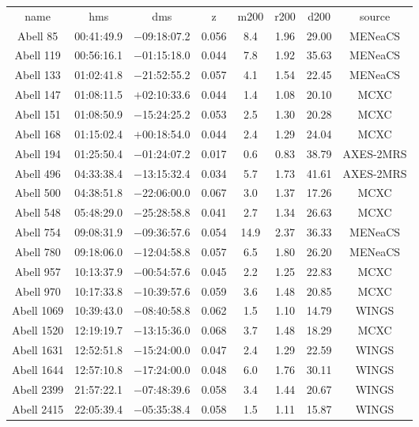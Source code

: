 \begin{table}
\begin{tabular}{cccccccc}
name & hms & dms & z & m200 & r200 & d200 & source \\
Abell 85 & 00:41:49.9 & $-$09:18:07.2 & 0.056 & 8.4 & 1.96 & 29.00 & MENeaCS \\
Abell 119 & 00:56:16.1 & $-$01:15:18.0 & 0.044 & 7.8 & 1.92 & 35.63 & MENeaCS \\
Abell 133 & 01:02:41.8 & $-$21:52:55.2 & 0.057 & 4.1 & 1.54 & 22.45 & MENeaCS \\
Abell 147 & 01:08:11.5 & $+$02:10:33.6 & 0.044 & 1.4 & 1.08 & 20.10 & MCXC \\
Abell 151 & 01:08:50.9 & $-$15:24:25.2 & 0.053 & 2.5 & 1.30 & 20.28 & MCXC \\
Abell 168 & 01:15:02.4 & $+$00:18:54.0 & 0.044 & 2.4 & 1.29 & 24.04 & MCXC \\
Abell 194 & 01:25:50.4 & $-$01:24:07.2 & 0.017 & 0.6 & 0.83 & 38.79 & AXES-2MRS \\
Abell 496 & 04:33:38.4 & $-$13:15:32.4 & 0.034 & 5.7 & 1.73 & 41.61 & AXES-2MRS \\
Abell 500 & 04:38:51.8 & $-$22:06:00.0 & 0.067 & 3.0 & 1.37 & 17.26 & MCXC \\
Abell 548 & 05:48:29.0 & $-$25:28:58.8 & 0.041 & 2.7 & 1.34 & 26.63 & MCXC \\
Abell 754 & 09:08:31.9 & $-$09:36:57.6 & 0.054 & 14.9 & 2.37 & 36.33 & MENeaCS \\
Abell 780 & 09:18:06.0 & $-$12:04:58.8 & 0.057 & 6.5 & 1.80 & 26.20 & MENeaCS \\
Abell 957 & 10:13:37.9 & $-$00:54:57.6 & 0.045 & 2.2 & 1.25 & 22.83 & MCXC \\
Abell 970 & 10:17:33.8 & $-$10:39:57.6 & 0.059 & 3.6 & 1.48 & 20.85 & MCXC \\
Abell 1069 & 10:39:43.0 & $-$08:40:58.8 & 0.062 & 1.5 & 1.10 & 14.79 & WINGS \\
Abell 1520 & 12:19:19.7 & $-$13:15:36.0 & 0.068 & 3.7 & 1.48 & 18.29 & MCXC \\
Abell 1631 & 12:52:51.8 & $-$15:24:00.0 & 0.047 & 2.4 & 1.29 & 22.59 & WINGS \\
Abell 1644 & 12:57:10.8 & $-$17:24:00.0 & 0.048 & 6.0 & 1.76 & 30.11 & WINGS \\
Abell 2399 & 21:57:22.1 & $-$07:48:39.6 & 0.058 & 3.4 & 1.44 & 20.67 & WINGS \\
Abell 2415 & 22:05:39.4 & $-$05:35:38.4 & 0.058 & 1.5 & 1.11 & 15.87 & WINGS \\

\end{tabular}
\end{table}
